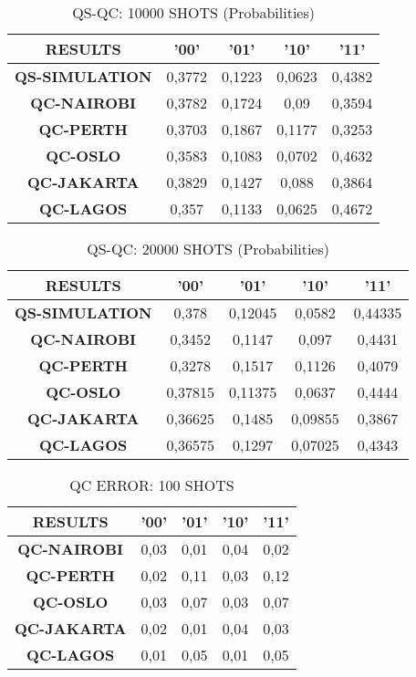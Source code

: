 \begin{table}[!ht]
    \centering
    \begin{tabular}{ccccc}
    \hline
        \textbf{RESULTS} & \textbf{'00'} & \textbf{'01'} & \textbf{'10'} & \textbf{'11' } \\ \hline
        \textbf{QS-SIMULATION} & 0,3772 & 0,1223 & 0,0623 & 0,4382  \\ 
        \textbf{QC-NAIROBI} & 0,3782 & 0,1724 & 0,09 & 0,3594  \\ 
        \textbf{QC-PERTH} & 0,3703 & 0,1867 & 0,1177 & 0,3253  \\ 
        \textbf{QC-OSLO} & 0,3583 & 0,1083 & 0,0702 & 0,4632  \\ 
        \textbf{QC-JAKARTA} & 0,3829 & 0,1427 & 0,088 & 0,3864  \\ 
        \textbf{QC-LAGOS} & 0,357 & 0,1133 & 0,0625 & 0,4672 \\ \hline
    \end{tabular}
    \caption{QS-QC: 10000 SHOTS (Probabilities)}
\end{table}

\begin{table}[!ht]
    \centering
    \begin{tabular}{ccccc}
    \hline
        \textbf{RESULTS} & \textbf{'00'} & \textbf{'01'} & \textbf{'10'} & \textbf{'11' } \\ \hline
        \textbf{QS-SIMULATION} & 0,378 & 0,12045 & 0,0582 & 0,44335  \\ 
        \textbf{QC-NAIROBI} & 0,3452 & 0,1147 & 0,097 & 0,4431  \\ 
        \textbf{QC-PERTH} & 0,3278 & 0,1517 & 0,1126 & 0,4079  \\ 
        \textbf{QC-OSLO} & 0,37815 & 0,11375 & 0,0637 & 0,4444  \\ 
        \textbf{QC-JAKARTA} & 0,36625 & 0,1485 & 0,09855 & 0,3867  \\ 
        \textbf{QC-LAGOS} & 0,36575 & 0,1297 & 0,07025 & 0,4343 \\ \hline
    \end{tabular}
    \caption{QS-QC: 20000 SHOTS (Probabilities)}
\end{table}


\begin{table}[!ht]
    \centering
    \begin{tabular}{ccccc}
    \hline
        \textbf{RESULTS} & \textbf{'00'} & \textbf{'01'} & \textbf{'10'} & \textbf{'11' } \\ \hline
        \textbf{QC-NAIROBI} & 0,03 & 0,01 & 0,04 & 0,02  \\ 
        \textbf{QC-PERTH} & 0,02 & 0,11 & 0,03 & 0,12  \\ 
        \textbf{QC-OSLO} & 0,03 & 0,07 & 0,03 & 0,07  \\ 
        \textbf{QC-JAKARTA} & 0,02 & 0,01 & 0,04 & 0,03  \\ 
        \textbf{QC-LAGOS} & 0,01 & 0,05 & 0,01 & 0,05 \\ \hline
    \end{tabular}
    \caption{QC ERROR: 100 SHOTS}
\end{table}


